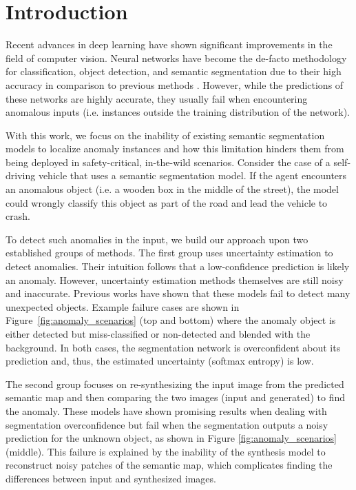\documentclass[final]{cvpr}
\begin{document}
\section{Introduction}






Recent advances in deep learning have shown significant improvements in the field of computer vision. Neural networks have become the de-facto methodology for classification, object detection, and semantic segmentation due to their high accuracy in comparison to previous methods \cite{best_classification, best_objectdetection, best_segmentation}. However, while the predictions of these networks are highly accurate, they usually fail when encountering anomalous inputs (i.e. instances outside the training distribution of the network).


With this work, we focus on the inability of existing semantic segmentation models to localize anomaly instances and how this limitation hinders them from being deployed in safety-critical, in-the-wild scenarios. Consider the case of a self-driving vehicle that uses a semantic segmentation model. If the agent encounters an anomalous object (i.e. a wooden box in the middle of the street), the model could wrongly classify this object as part of the road and lead the vehicle to crash.

To detect such anomalies in the input, we build our approach  upon two established groups of methods.
The first group uses uncertainty estimation to detect anomalies. Their intuition follows that a low-confidence prediction is likely an anomaly. However, uncertainty estimation methods themselves are still noisy and inaccurate.  Previous works \cite{epfl,fishyscapes} have shown that these models fail to detect many unexpected objects. Example failure cases are shown in Figure~\ref{fig:anomaly_scenarios} (top and bottom) where the anomaly object is either detected but miss-classified or non-detected and blended with the background. In both cases, the segmentation network is overconfident about its prediction and, thus, the estimated uncertainty (softmax entropy) is low.   

The second group focuses on re-synthesizing the input image from the predicted semantic map and then comparing the two images (input and generated) to find the anomaly. These models have shown promising results when dealing with segmentation overconfidence but fail when the segmentation outputs a noisy prediction for the unknown object, as shown in Figure \ref{fig:anomaly_scenarios} (middle). This failure is explained by the inability of the synthesis model to reconstruct noisy patches of the semantic map, which complicates finding the differences between input and synthesized images.
\end{document}
